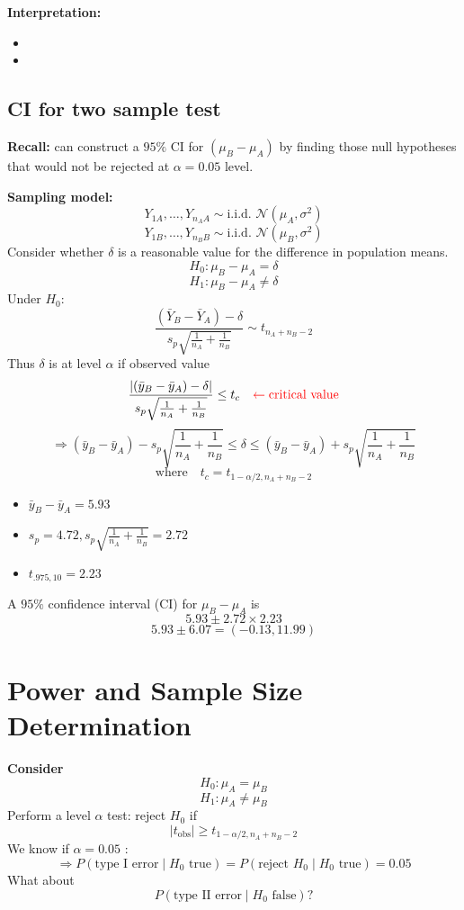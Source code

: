 \documentclass[14pt]{extarticle}
\begin{document}
\vspace{0.5cm}
\textbf{Interpretation:}
\begin{itemize}
    \item {}
    \item {}
\end{itemize}

\subsection*{CI for two sample test}

\textbf{Recall:} can construct a $95\%$ CI for $(\mu_B - \mu_A)$ by finding those null hypotheses that would not be rejected at $\alpha = 0.05$ level.

\noindent \textbf{Sampling model:}
\[
Y_{1A}, \dots, Y_{n_A A} \sim \text{i.i.d. } \mathcal{N}(\mu_A, \sigma^2)
\]
\[
Y_{1B}, \dots, Y_{n_B B} \sim \text{i.i.d. } \mathcal{N}(\mu_B, \sigma^2)
\]
\noindent Consider whether $\delta$ is a reasonable value for the difference in population means.
\[
H_0: \mu_B - \mu_A = \delta
\]
\[
H_1: \mu_B - \mu_A \neq \delta
\]
Under $H_0$:
\[
\frac{(\bar{Y}_B - \bar{Y}_A) - \delta}{s_p \sqrt{\frac{1}{n_A} + \frac{1}{n_B}}} \sim t_{n_A + n_B - 2}
\]
Thus $\delta$  is \textcolor{blue}{} at level $\alpha$ if observed value
\[
\frac{|(\bar{y}_B - \bar{y}_A) - \delta|}{s_p \sqrt{\frac{1}{n_A} + \frac{1}{n_B}}} \leq t_c \quad
\textcolor{red}{\leftarrow \text{critical value}}
\]
\[
\Rightarrow (\bar{y}_B - \bar{y}_A) - s_p \sqrt{\frac{1}{n_A} + \frac{1}{n_B}} \leq \delta \leq (\bar{y}_B - \bar{y}_A) + s_p \sqrt{\frac{1}{n_A} + \frac{1}{n_B}}
\]
\[
\text{where} \quad
t_c = t_{1-\alpha/2, n_A + n_B - 2}
\]
\noindent {}
\begin{itemize}
    \item $\bar{y}_B - \bar{y}_A = 5.93$
    \item $s_p = 4.72, s_p \sqrt{\frac{1}{n_A} + \frac{1}{n_B}} = 2.72$
    \item $t_{.975, 10} = 2.23$
\end{itemize}

A $95\%$ confidence interval (CI) for $\mu_B - \mu_A$ is
\[
5.93 \pm 2.72 \times 2.23
\]
\[
5.93 \pm 6.07 = (-0.13, 11.99)
\]



\newpage
\section*{Power and Sample Size Determination}
\textbf{Consider}
\[
H_0: \mu_A = \mu_B
\]
\[
H_1: \mu_A \neq \mu_B
\]
Perform a level $\alpha$ test: reject $H_0$ if
\[
|t_{\text{obs}}| \geq t_{1-\alpha/2, n_A + n_B - 2}
\]
We know if $\alpha = 0.05$ :
\[
\Rightarrow P(\text{type I error} \mid H_0 \text{ true}) = P(\text{reject } H_0 \mid H_0 \text{ true}) = 0.05
\]
What about
\[
P(\text{type II error} \mid H_0 \text{ false}) ?
\]
\end{document}
